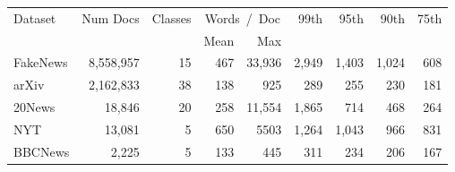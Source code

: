 {
\small
\begin{tabular}{lrrrrrrrr}
\toprule
Dataset & Num Docs & Classes & \multicolumn{2}{c}{Words~/~Doc} &99th &95th &90th &75th \\
    \cmidrule{4-5}
& & & Mean&  Max \\
\midrule
FakeNews &8,558,957 &15 &467 &33,936 &2,949 &1,403 &1,024 &608 \\
arXiv &2,162,833 &38 &138 &925 &289 &255 &230 &181 \\
20News &18,846 &20 &258 &11,554 &1,865 &714 &468 &264\\
NYT &13,081 &5 &650 &5503 &1,264 &1,043 &966 &831\\
BBCNews &2,225 &5 &133 &445 &311 &234 &206 &167\\
\bottomrule
\end{tabular}
}
